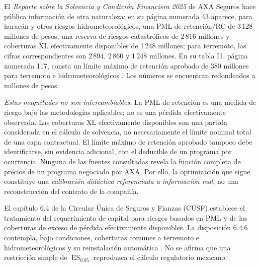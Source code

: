 \documentclass[11pt,reqno]{amsart}
\theoremstyle{definition}\newtheorem{definition}[theorem]{Definición}
\theoremstyle{remark}\newtheorem{remark}[theorem]{Observación}
\DeclareMathOperator{\ES}{ES}
\begin{document}
El \emph{Reporte sobre la Solvencia y Condición Financiera 2025} de AXA Seguros hace pública información de otra naturaleza: en su página numerada 43 aparece, para huracán y otros riesgos hidrometeorológicos, una PML de retención/RC de 3\,128 millones de pesos, una reserva de riesgos catastróficos de 2\,816 millones y coberturas XL efectivamente disponibles de 1\,248 millones; para terremoto, las cifras correspondientes son 2\,894, 2\,860 y 1\,248 millones. En su tabla I1, página numerada 117, consta un límite máximo de retención aprobado de 380 millones para terremoto e hidrometeorológicos \cite{AXA2025}. Los números se encuentran redondeados a millones de pesos.

\emph{Estas magnitudes no son intercambiables.} La PML de retención es una medida de riesgo bajo las metodologías aplicables; no es una pérdida efectivamente observada. Las coberturas XL efectivamente disponibles son una partida considerada en el cálculo de solvencia, no necesariamente el límite nominal total de una capa contractual. El límite máximo de retención aprobado tampoco debe identificarse, sin evidencia adicional, con el deducible de un programa por ocurrencia. Ninguna de las fuentes consultadas revela la función completa de precios de un programa negociado por AXA. Por ello, la optimización que sigue constituye una \emph{calibración didáctica referenciada a información real}, no una reconstrucción del contrato de la compañía.

El capítulo 6.4 de la Circular Única de Seguros y Fianzas (CUSF) establece el tratamiento del requerimiento de capital para riesgos basados en PML y de las coberturas de exceso de pérdida efectivamente disponibles. La disposición 6.4.6 contempla, bajo condiciones, coberturas comunes a terremoto e hidrometeorológicos y su reinstalación automática \cite{CUSF64}. No se afirma que una restricción simple de $\ES_{0.95}$ reproduzca el cálculo regulatorio mexicano.
\end{document}
